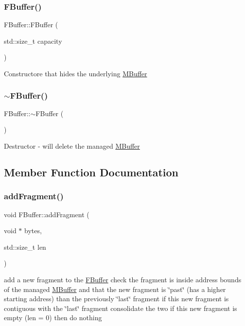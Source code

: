 \subsubsection{\texorpdfstring{F\+Buffer()}{FBuffer()}\hspace{0.1cm}{\footnotesize\ttfamily [2/2]}}
{\footnotesize\ttfamily F\+Buffer\+::\+F\+Buffer (\begin{DoxyParamCaption}\item[{std\+::size\+\_\+t}]{capacity }\end{DoxyParamCaption})}

Constructore that hides the underlying \hyperlink{struct_m_buffer}{M\+Buffer} \mbox{\label{class_f_buffer_a4e490d569edada34d24a5b16da72fafc}} 
\subsubsection{\texorpdfstring{$\sim$\+F\+Buffer()}{~FBuffer()}}
{\footnotesize\ttfamily F\+Buffer\+::$\sim$\+F\+Buffer (\begin{DoxyParamCaption}{ }\end{DoxyParamCaption})}

Destructor -\/ will delete the managed \hyperlink{struct_m_buffer}{M\+Buffer} 

\subsection{Member Function Documentation}
\mbox{\label{class_f_buffer_aee2d12df78293e2b3e8da359e7d0a757}} 
\subsubsection{\texorpdfstring{add\+Fragment()}{addFragment()}}
{\footnotesize\ttfamily void F\+Buffer\+::add\+Fragment (\begin{DoxyParamCaption}\item[{void $\ast$}]{bytes,  }\item[{std\+::size\+\_\+t}]{len }\end{DoxyParamCaption})}

add a new fragment to the \hyperlink{class_f_buffer}{F\+Buffer} check the fragment is inside address bounds of the managed \hyperlink{struct_m_buffer}{M\+Buffer} and that the new fragment is \char`\"{}past\char`\"{} (has a higher starting address) than the previously \char`\"{}last\char`\"{} fragment if this new fragment is contiguous with the \char`\"{}last\char`\"{} fragment consolidate the two if this new fragment is empty (len = 0) then do nothing \mbox{\label{class_f_buffer_a64064a784e0ada0957d76db6c83b22fa}} 
